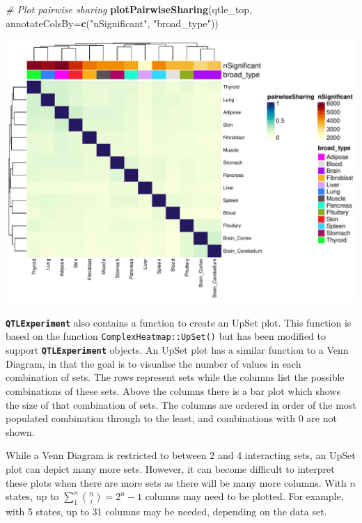 \documentclass[
]{article}
\newenvironment{Shaded}{\begin{snugshade}}{\end{snugshade}}
\newcommand{\AttributeTok}[1]{\textcolor[rgb]{0.13,0.29,0.53}{#1}}
\newcommand{\CommentTok}[1]{\textcolor[rgb]{0.56,0.35,0.01}{\textit{#1}}}
\newcommand{\FunctionTok}[1]{\textcolor[rgb]{0.13,0.29,0.53}{\textbf{#1}}}
\newcommand{\NormalTok}[1]{#1}
\newcommand{\StringTok}[1]{\textcolor[rgb]{0.31,0.60,0.02}{#1}}
\begin{document}
\begin{Shaded}
\begin{Highlighting}[]
\CommentTok{\# Plot pairwise sharing}
\FunctionTok{plotPairwiseSharing}\NormalTok{(qtle\_top, }\AttributeTok{annotateColsBy=}\FunctionTok{c}\NormalTok{(}\StringTok{"nSignificant"}\NormalTok{, }\StringTok{"broad\_type"}\NormalTok{))}
\end{Highlighting}
\end{Shaded}

\includegraphics{GTEx_files/figure-latex/plot-pairwise-sharing-gtex-1.pdf}
\normalsize

\textbf{\texttt{QTLExperiment}} also contains a function to create an
UpSet plot. This function is based on the function
\texttt{ComplexHeatmap::UpSet()} but has been modified to support
\textbf{\texttt{QTLExperiment}} objects. An UpSet plot has a similar
function to a Venn Diagram, in that the goal is to visualise the number
of values in each combination of sets. The rows represent sets while the
columns list the possible combinations of these sets. Above the columns
there is a bar plot which shows the size of that combination of sets.
The columns are ordered in order of the most populated combination
through to the least, and combinations with 0 are not shown.

While a Venn Diagram is restricted to between 2 and 4 interacting sets,
an UpSet plot can depict many more sets. However, it can become
difficult to interpret these plots when there are more sets as there
will be many more columns. With \(n\) states, up to
\(\sum_{1}^n {n \choose i} = 2^n - 1\) columns may need to be plotted.
For example, with 5 states, up to 31 columns may be needed, depending on
the data set.
\end{document}
